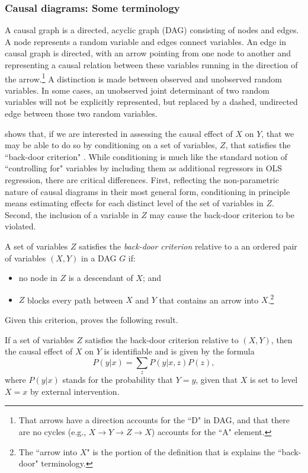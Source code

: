 \documentclass[11pt]{amsart}
\begin{document}
\subsubsection{Causal diagrams: Some terminology}
A causal graph is a directed, acyclic graph (DAG) consisting of nodes and edges.
A node represents a random variable and edges connect variables.
An edge in causal graph is directed, with an arrow pointing from one node to another and representing a causal relation between these variables running in the direction of the arrow.\footnote{
That arrows have a direction accounts for the ``D" in DAG, and that there are no cycles (e.g., $X \rightarrow Y \rightarrow Z \rightarrow X$) accounts for the ``A" element.}
A distinction is made between observed and unobserved random variables.
In some cases, an unobserved joint determinant of two random variables will not be explicitly represented, but replaced by a dashed, undirected edge between those two random variables.

\citet{Pearl:2009kh} shows that, if we are interested in assessing the causal effect of $X$ on $Y$, that we may be able to do so by conditioning on a set of variables, $Z$, that satisfies the ``back-door criterion" \citep[p.79]{Pearl:2009kh}.
While conditioning is much like the standard notion of ``controlling for" variables by including them as additional regressors in OLS regression, there are critical differences.
First, reflecting the non-parametric nature of causal diagrams in their most general form, conditioning in principle means estimating effects for each distinct level of the set of variables in $Z$.
Second, the inclusion of a variable in $Z$ may cause the back-door criterion to be violated. 

\begin{definition}
A set of variables $Z$ satisfies the \emph{back-door criterion} relative to a an ordered pair of variables $(X, Y)$ in a 
	DAG $G$ if:
	\begin{itemize}
		\item no node in $Z$ is a descendant of $X$; and
		\item $Z$ blocks every path between $X$ and $Y$ that contains an arrow into $X$.\footnote{The ``arrow into $X$" is the portion of the definition that is explains the ``back-door" terminology.}
	\end{itemize}
\end{definition}
Given this criterion, \citet{Pearl:2009kh} proves the following result.
\begin{theorem}
	If a set of variables $Z$ satisfies the back-door criterion relative to $(X, Y)$, then the causal effect of $X$ on $Y$ is identifiable and is given by the formula 
	\[ P(y | x) = \sum_{z} P(y | x, z) P(z), \]
where $P(y|x)$ stands for the probability that $Y = y$, given that $X$ is set to level $X=x$ by external intervention.
\end{theorem}
\end{document}
